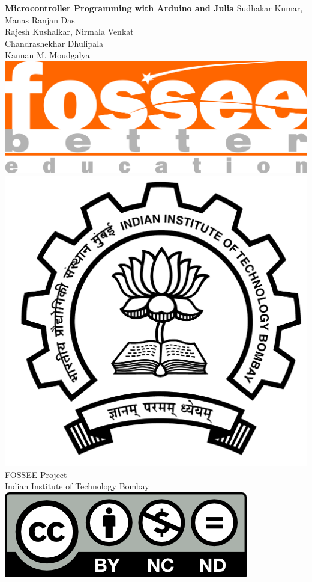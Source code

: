 \begin{center}
    {\bf {\Huge Microcontroller Programming with Arduino and Julia}}
    \vfill
    Sudhakar Kumar, Manas Ranjan Das \\
    Rajesh Kushalkar, Nirmala Venkat \\
    Chandrashekhar Dhulipala \\
    Kannan M. Moudgalya \\
    \vfill
    \includegraphics[width=0.3\linewidth]{suppl/fossee_logo_hi.png} \quad
    \includegraphics[width=0.2\linewidth]{suppl/IITB-logo-HighRes.png} \\
    FOSSEE Project \\
    Indian Institute of Technology Bombay \\ [2mm]
    \includegraphics[width=0.15\linewidth]{suppl/by-nc-nd.png}
\end{center}

\clearpage
